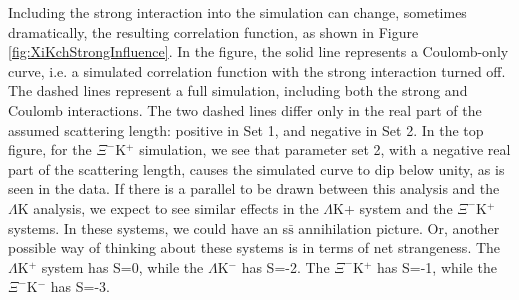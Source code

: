 \documentclass[/home/jesse/Analysis/FemtoAnalysis/AnalysisNotes/AnalysisNoteJBuxton.tex]{subfiles}
\begin{document}
Including the strong interaction into the simulation can change, sometimes dramatically, the resulting correlation function, as shown in Figure \ref{fig:XiKchStrongInfluence}.  In the figure, the solid line represents a Coulomb-only curve, i.e. a simulated correlation function with the strong interaction turned off.  The dashed lines represent a full simulation, including both the strong and Coulomb interactions.  The two dashed lines differ only in the real part of the assumed scattering length: positive in Set 1, and negative in Set 2.  In the top figure, for the $\Xi^{-}$K$^{+}$ simulation, we see that parameter set 2, with a negative real part of the scattering length, causes the simulated curve to dip below unity, as is seen in the data.  If there is a parallel to be drawn between this analysis and the $\Lambda$K analysis, we expect to see similar effects in the $\Lambda$K+ system and the $\Xi^{-}$K$^{+}$ systems.  In these systems, we could have an s$\bar{\mathrm{s}}$ annihilation picture.  Or, another possible way of thinking about these systems is in terms of net strangeness.  The $\Lambda$K$^{+}$ system has S=0, while the $\Lambda$K$^{-}$ has S=-2.  The $\Xi^{-}$K$^{+}$ has S=-1, while the $\Xi^{-}$K$^{-}$ has S=-3.
\end{document}

